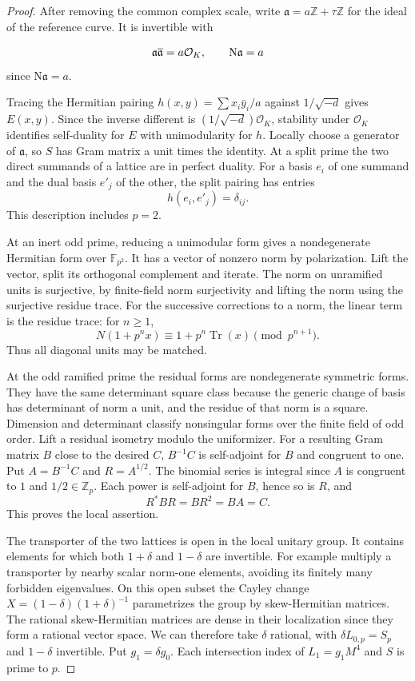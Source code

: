 \begin{proof}
After removing the common complex scale, write
\(\mathfrak a=a\mathbb Z+\tau\mathbb Z\) for the ideal of the
reference curve. It is invertible with

\[
  \mathfrak a\overline{\mathfrak a}=a\mathcal O_K,\qquad {\rm N}\mathfrak a=a
\]
 since
\(\mathrm N\mathfrak a=a\).

Tracing the Hermitian pairing
\(h(x,y)=\sum x_i\bar y_i/a\) against
\(1/\sqrt{-d}\) gives \(E(x,y)\). Since the inverse
different is \((1/\sqrt{-d})\mathcal O_K\), stability under
\(\mathcal O_K\) identifies self-duality for \(E\) with
unimodularity for \(h\). Locally choose a generator of
\(\mathfrak a\), so \(S\) has Gram matrix a unit times the
identity. At a split prime the two direct summands of a lattice
are in perfect duality. For a basis \(e_i\) of one summand and the dual basis \(e'_j\) of the other, the split pairing has entries
\[
  h(e_i,e'_j)=\delta_{ij}.
\]
This description includes \(p=2\).

At an inert odd prime, reducing a
unimodular form gives a nondegenerate Hermitian form over
\(\mathbb F_{p^2}\). It has a vector of nonzero norm by
polarization. Lift the vector, split its orthogonal complement
and iterate. The norm on unramified units is surjective, by
finite-field norm surjectivity and lifting the norm using the
surjective residue trace.
For the successive corrections to a norm, the linear term is the residue trace: for \(n\ge1\),
\[
  N(1+p^nx)\equiv 1+p^n\operatorname{Tr}(x)\pmod {p^{n+1}}.
\]
 Thus all diagonal units may be matched.

At the odd ramified prime the residual forms are nondegenerate
symmetric forms. They have the same determinant square class
because the generic change of basis has determinant of norm a
unit, and the residue of that norm is a square. Dimension and
determinant classify nonsingular forms over the finite field of
odd order. Lift a residual isometry modulo the uniformizer.
For a resulting Gram matrix \(B\) close to the desired \(C\),
\(B^{-1}C\) is self-adjoint for \(B\) and congruent to one.
Put \(A=B^{-1}C\) and \(R=A^{1/2}\).
The binomial series is integral since \(A\) is congruent
to \(1\) and \(1/2\in\mathbb Z_p\). Each power is
self-adjoint for \(B\), hence so is \(R\), and
\[
                  R^* B R=BR^2=BA=C .
\] This proves the local assertion.

The transporter of the two lattices is open in the local
unitary group. It contains elements for which both \(1+\delta\)
and \(1-\delta\) are invertible. For example multiply a
transporter by nearby scalar norm-one elements, avoiding its
finitely many forbidden eigenvalues. On this open subset
the Cayley change \(X=(1-\delta)(1+\delta)^{-1}\) parametrizes
the group by skew-Hermitian matrices. The rational skew-Hermitian
matrices are dense in their localization since they form a
rational vector space. We can therefore take \(\delta\) rational,
with \(\delta L_{0,p}=S_p\) and \(1-\delta\) invertible.
Put \(g_1=\delta g_0\). Each intersection index of
\(L_1=g_1M^4\) and \(S\) is prime to \(p\).
\end{proof}

